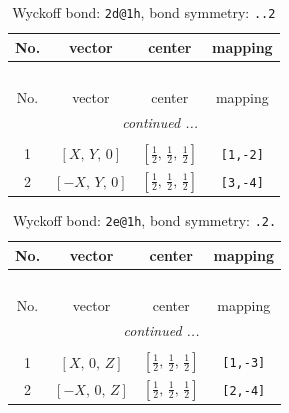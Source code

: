 \documentclass[fleqn,8pt]{jsarticle}
\begin{document}
\renewcommand{\arraystretch}{1.2}
\begin{longtable}{cccc}
\caption{Wyckoff bond: {\tt 2d@1h}, bond symmetry: {\tt ..2}}
 \\
 \hline \hline
No. & vector & center & mapping \\ \hline \endfirsthead

\multicolumn{3}{l}{\tablename\ \thetable{}} \\
 \hline \hline
No. & vector & center & mapping \\ \hline \endhead

 \hline \hline
\multicolumn{3}{r}{\footnotesize\it continued ...} \\ \endfoot

 \hline \hline
\multicolumn{3}{r}{} \\ \endlastfoot

1 & $\left[ X,\, Y,\, 0 \right]$ & $\left[ \frac{1}{2},\, \frac{1}{2},\, \frac{1}{2} \right]$ & {\tt [1,-2]} \\ \hline
2 & $\left[ - X,\, Y,\, 0 \right]$ & $\left[ \frac{1}{2},\, \frac{1}{2},\, \frac{1}{2} \right]$ & {\tt [3,-4]} \\
\end{longtable}
\renewcommand{\arraystretch}{1.2}
\begin{longtable}{cccc}
\caption{Wyckoff bond: {\tt 2e@1h}, bond symmetry: {\tt .2.}}
 \\
 \hline \hline
No. & vector & center & mapping \\ \hline \endfirsthead

\multicolumn{3}{l}{\tablename\ \thetable{}} \\
 \hline \hline
No. & vector & center & mapping \\ \hline \endhead

 \hline \hline
\multicolumn{3}{r}{\footnotesize\it continued ...} \\ \endfoot

 \hline \hline
\multicolumn{3}{r}{} \\ \endlastfoot

1 & $\left[ X,\, 0,\, Z \right]$ & $\left[ \frac{1}{2},\, \frac{1}{2},\, \frac{1}{2} \right]$ & {\tt [1,-3]} \\ \hline
2 & $\left[ - X,\, 0,\, Z \right]$ & $\left[ \frac{1}{2},\, \frac{1}{2},\, \frac{1}{2} \right]$ & {\tt [2,-4]} \\
\end{longtable}
\renewcommand{\arraystretch}{1.2}
\end{document}
